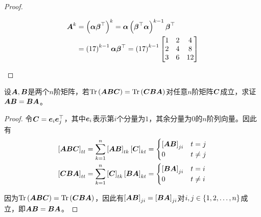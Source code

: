 \begin{proof}
\begin{enumerate}
              \begin{align*}
                  \mata^k & =\mypar{\vecal\vecbeta^\top}^k=\vecal\mypar{\vecbeta^\top\vecal}^{k-1}\vecbeta^\top \\
                          & =\mypar{17}^{k-1}\vecal\vecbeta^\top=\mypar{17}^{k-1}
                  \begin{bmatrix}
                      1 & 2 & 4 \\2&4&8\\3&6&12
                  \end{bmatrix}
              \end{align*}
    \end{enumerate}
\end{proof}

\begin{problem}
设\(\mata,\matb\)是两个\(n\)阶矩阵，若\(\trace{\mata\matb\matc}=\trace{\matc\matb\mata}\)对任意\(n\)阶矩阵\(\matc\)成立，求证\(\mata\matb=\matb\mata\)。
\end{problem}
\begin{proof}
    令\(\matc=\vece_i\vece_j^\top\)，其中\(\vece_i\)表示第\(i\)个分量为\(1\)，其余分量为\(0\)的\(n\)阶列向量。因此有
    \begin{align*}
        \mat{\mata\matb\matc}_{tt} & =\sum_{k=1}^n\mat{\mata\matb}_{tk}\mat{\matc}_{kt}=
        \begin{cases}
            \mat{\mata\matb}_{ji} & t=j     \\
            0                     & t\neq j
        \end{cases}                                                  \\
        \mat{\matc\matb\mata}_{tt} & =\sum_{k=1}^n\mat{\matc}_{tk}\mat{\matb\mata}_{kt}=
        \begin{cases}
            \mat{\matb\mata}_{ji} & t=i     \\
            0                     & t\neq i
        \end{cases}
    \end{align*}

    因为\(\trace{\mata\matb\matc}=\trace{\matc\matb\mata}\)，因此有\(\mat{\mata\matb}_{ji}=\mat{\matb\mata}_{ji}\)对\(i,j\in\setof{1,2,\dots,n}\)成立，即\(\mata\matb=\matb\mata\)。
\end{proof}

